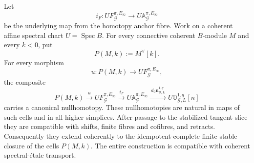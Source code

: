\begin{lemma}
\label{lem:symmetry-noether-the-first-noether-derivative-factors-through-the-field-action}
Let
\[
i_F:
UF_{\mathcal G}^{\pi,E_\infty}
\longrightarrow
U\mathbb A_{\mathcal G}^{\pi,E_\infty}
\]
be the underlying map from the homotopy anchor fibre.  Work on a coherent affine
spectral chart $U=\operatorname{Spec}B$.  For every connective coherent
$B$-module $M$ and every $k<0$, put
\[
P(M,k):=M^\vee[k].
\]
For every morphism
\[
u:P(M,k)\longrightarrow UF_{\mathcal G}^{\pi,E_\infty},
\]
the composite
\[
P(M,k)
\xrightarrow{\ u\ }
UF_{\mathcal G}^{\pi,E_\infty}
\xrightarrow{\ i_F\ }
U\mathbb A_{\mathcal G}^{\pi,E_\infty}
\xrightarrow{\ d_0\mathbf n_{\mathcal G,L}^{1,q}\ }
U\mathbb O_{\mathcal G,L}^{1,q}[n]
\]
carries a canonical nullhomotopy.  These nullhomotopies are natural in maps of
such cells and in all higher simplices.  After passage to the stabilized tangent
slice they are compatible with shifts, finite fibres and cofibres, and retracts.
Consequently they extend coherently to the idempotent-complete finite stable
closure of the cells $P(M,k)$.  The entire construction is compatible with
coherent spectral-\'etale transport.
\end{lemma}

